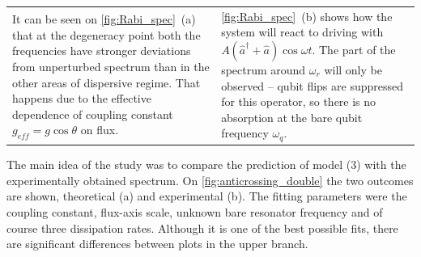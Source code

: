 \documentclass[a0, portrait]{a0poster}
\begin{document}
\begin{multicols}{2}
\begin{tcolorbox}[left=1cm, right=1cm, top=0.5cm, bottom=0.5cm, 
                  title={\Large Rabi model}, bottomtitle=.5cm, toptitle=.5cm
                  ]
\begin{minipage}{\textwidth}
\centering
{}
\label{fig:Rabi_spec}
\end{minipage}

\begin{minipage}{\textwidth}
\begin{tabular}{l@{\hspace{1cm}}l}
\parbox{0.5\textwidth}{It can be seen on \autoref{fig:Rabi_spec}~(a) that at the degeneracy point both the frequencies have stronger deviations from unperturbed spectrum than in the other areas of dispersive regime. That happens due to the effective dependence of coupling constant $g_{eff} = g\cos\theta$ on flux.}
&
\parbox{0.45\textwidth}{\autoref{fig:Rabi_spec}~(b) shows how the system will react to driving with $A (\hat a^\dag + \hat a)\cos\omega t$. The part of the spectrum around $\omega_r$ will only be observed -- qubit flips are suppressed for this operator, so there is no absorption at the bare qubit frequency $\omega_q$.}\\
\end{tabular}
\end{minipage}
\end{tcolorbox}

\begin{tcolorbox}[left=1cm, right=1cm, top=0.5cm, bottom=0.5cm, 
                  title={\Large Anticrossings}, bottomtitle=.3cm,toptitle=.5cm
                  ]
\captionsetup[subfigure]{justification=centering}                  
                    
\begingroup
\setlength{\columnsep}{1cm}	
\begin{multicols}{2}
The main idea of the study was to compare the prediction of model (3) with the experimentally obtained spectrum. On \autoref{fig:anticrossing_double} the two outcomes are shown, theoretical (a) and experimental (b). The fitting parameters were the coupling constant, flux-axis scale, unknown bare resonator frequency and of course three dissipation rates. Although it is one of the best possible fits, there are significant differences between plots in the upper branch.  
\end{multicols}
\endgroup

\vspace{.5cm}
\begin{minipage}{\textwidth}


\end{minipage}
\end{tcolorbox}
\end{multicols}
\end{document}
